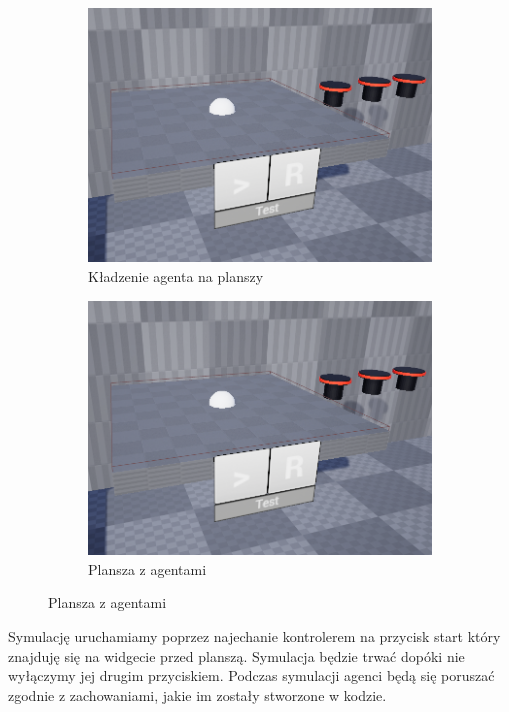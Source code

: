 \documentclass[a4paper,12pt,reqno]{article}
\begin{document}
\begin{figure}[H]%
	\centering
	\begin{subfigure}{.5\textwidth}
		\centering
		\includegraphics[width=0.8\linewidth]{graphics//agent/AgentInUE_1.png}
		\caption{Kładzenie agenta na planszy}	
		\label{ref:subref_a}
	\end{subfigure}%
	\begin{subfigure}{.5\textwidth}
		\centering
		\includegraphics[width=0.8\linewidth]{graphics//agent/AgentInUE_1.png}
		\caption{Plansza z agentami}
		\label{ref:subref_b}
	\end{subfigure}%
\label{ref:ref}
\end{figure}

Symulację uruchamiamy poprzez najechanie kontrolerem na przycisk start który znajduję się na widgecie przed planszą. Symulacja będzie trwać dopóki nie wyłączymy jej drugim przyciskiem. Podczas symulacji agenci będą się poruszać zgodnie z zachowaniami, jakie im zostały stworzone w kodzie.
\end{document}

